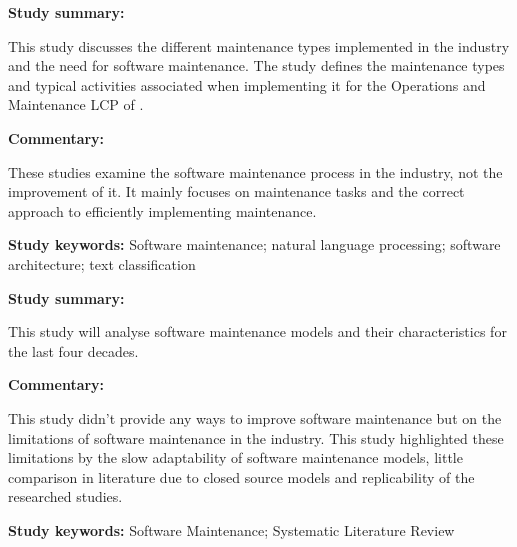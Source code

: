 \begin{tcolorbox}[colback=gray!5!white, colframe=deepblue!80!black, title=Supporting Software Architecture Maintenance by Providing Task-specific Recommendations \cite{Galster2019}]
	\begin{minipage}[t]{0.25\textwidth}
		\textbf{Study summary:}
	\end{minipage}
	\hfill
	\begin{minipage}[t]{0.65\textwidth}
		This study discusses the different maintenance types implemented in the industry and the need for software maintenance. The study defines the maintenance types and typical activities associated when implementing it for the Operations and Maintenance LCP of .
	\end{minipage}

	\vspace{0.75em} 

	\begin{minipage}[t]{0.25\textwidth}
		\textbf{Commentary:}
	\end{minipage}
	\hfill
	\begin{minipage}[t]{0.65\textwidth}
		These studies examine the software maintenance process in the industry, not the improvement of it. It mainly focuses on maintenance tasks and the correct approach to efficiently implementing maintenance.
	\end{minipage}
	\tcblower
	\textbf{Study keywords:} Software maintenance; natural language processing; software architecture; text classification
\end{tcolorbox}

\begin{tcolorbox}[colback=gray!5!white, colframe=deepblue!80!black, title=Analyzing Forty Years of Software Maintenance Models\cite{Lenarduzzi2017}]
	\begin{minipage}[t]{0.25\textwidth}
		\textbf{Study summary:}
	\end{minipage}
	\hfill
	\begin{minipage}[t]{0.65\textwidth}
		This study will analyse software maintenance models and their characteristics for the last four decades.
	\end{minipage}

	\vspace{0.75em} 

	\begin{minipage}[t]{0.25\textwidth}
		\textbf{Commentary:}
	\end{minipage}
	\hfill
	\begin{minipage}[t]{0.65\textwidth}
		This study didn't provide any ways to improve software maintenance but on the limitations of software maintenance in the industry. This study highlighted these limitations by the slow adaptability of software maintenance models, little comparison in literature due to closed source models and replicability of the researched studies.
	\end{minipage}
	\tcblower
	\textbf{Study keywords:} Software Maintenance; Systematic Literature Review
\end{tcolorbox}

